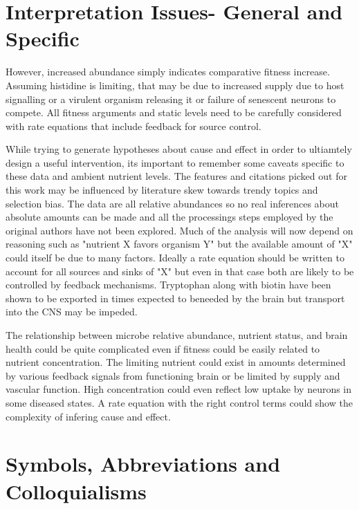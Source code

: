 \documentclass[aps,secnumarabic,balancelastpage,amsmath,amssymb,nofootinbib]{revtex4}
\begin{document}
\section{Interpretation Issues- General and Specific }
\label{appendix:interp}


However, increased abundance simply indicates comparative fitness
increase. Assuming histidine is limiting, that may be due to
increased supply due to host signalling or a virulent
organism releasing it or failure of senescent neurons to 
compete. All fitness arguments and static levels need to
be carefully considered with rate equations that include
feedback for source control.  

While trying to generate hypotheses about cause and effect
in order to ultiamtely design a useful intervention, its
important to remember some caveats specific to these data
and ambient nutrient levels. 
The features and citations picked out for this work may be
influenced by literature skew towards trendy topics and
selection bias. 
The data are all relative
abundances so no real inferences about absolute
amounts can be made and all the processings
steps employed by the original authors have not been
explored. Much of the analysis will now depend
on reasoning such as "nutrient X favors organism Y"
but the available amount of "X" could itself be
due to many factors. Ideally a rate equation
should be written to account for all sources and sinks
of "X" but even in that case both are likely to be
controlled by feedback mechanisms. Tryptophan along
with biotin have been shown to be exported in
times expected to beneeded by the brain but
transport into the CNS may be impeded. 



The relationship between microbe relative abundance,
nutrient status, and brain health could be quite complicated
even if fitness could be easily related to nutrient
concentration. The limiting nutrient could exist
in amounts determined by various feedback signals
from functioning brain or be limited by supply and
vascular function. High concentration could even reflect
low uptake by neurons in some diseased states. A rate
equation with the right control terms could show the complexity
of infering cause and effect. 




\section{Symbols, Abbreviations and Colloquialisms}
\end{document}
